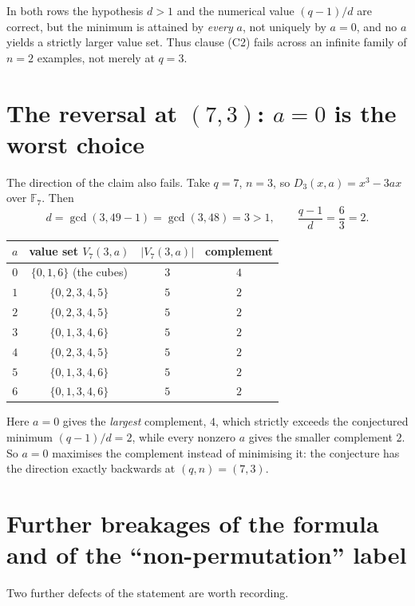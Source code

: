 \documentclass[11pt]{article}
\theoremstyle{definition}
\theoremstyle{remark}
\newcommand{\F}{\mathbb{F}}
\begin{document}
In both rows the hypothesis $d > 1$ and the numerical value $(q-1)/d$ are
correct, but the minimum is attained by \emph{every} $a$, not uniquely by
$a=0$, and no $a$ yields a strictly larger value set. Thus clause (C2) fails
across an infinite family of $n=2$ examples, not merely at $q=3$.

\section{The reversal at $(7,3)$: $a=0$ is the worst choice}

The direction of the claim also fails. Take $q = 7$, $n = 3$, so
$D_3(x,a) = x^3 - 3ax$ over $\F_7$. Then
\[
d = \gcd(3, 49-1) = \gcd(3,48) = 3 > 1,
\qquad
\frac{q-1}{d} = \frac{6}{3} = 2 .
\]

\begin{center}
\begin{tabular}{c c c c}
\toprule
$a$ & value set $V_7(3,a)$ & $|V_7(3,a)|$ & complement \\
\midrule
$0$ & $\{0,1,6\}$ (the cubes) & $3$ & $4$ \\
$1$ & $\{0,2,3,4,5\}$ & $5$ & $2$ \\
$2$ & $\{0,2,3,4,5\}$ & $5$ & $2$ \\
$3$ & $\{0,1,3,4,6\}$ & $5$ & $2$ \\
$4$ & $\{0,2,3,4,5\}$ & $5$ & $2$ \\
$5$ & $\{0,1,3,4,6\}$ & $5$ & $2$ \\
$6$ & $\{0,1,3,4,6\}$ & $5$ & $2$ \\
\bottomrule
\end{tabular}
\end{center}

Here $a = 0$ gives the \emph{largest} complement, $4$, which strictly exceeds
the conjectured minimum $(q-1)/d = 2$, while every nonzero $a$ gives the
smaller complement $2$. So $a=0$ maximises the complement instead of
minimising it: the conjecture has the direction exactly backwards at
$(q,n) = (7,3)$.

\section{Further breakages of the formula and of the ``non-permutation'' label}

Two further defects of the statement are worth recording.
\end{document}

